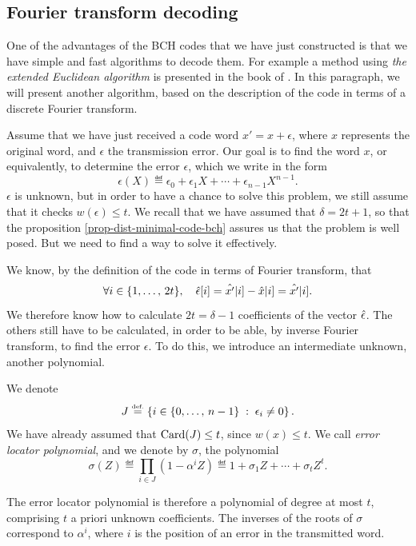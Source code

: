 \subsection{Fourier transform decoding}
\label{sect2-decodage-bch}
 
 
  One of the advantages of the BCH codes that we have just constructed is that we have simple and fast algorithms to decode them. For example a method using \textit{the extended Euclidean algorithm} is presented in the book of  \cite{demazure}. In this paragraph, we will present another algorithm, based on the description of the code in terms of a discrete Fourier transform.
 
 
Assume that we have just received a code word $ x'= x + \epsilon $, where $ x $ represents the original word, and $ \epsilon $ the transmission error. Our goal is to find the word $ x $, or equivalently, to determine the error $ \epsilon $, which we write in the form
\begin{equation*}
\epsilon (X) \eqdef \epsilon_0 + \epsilon_1 X + \cdots + \epsilon_{n-1} X^{n-1}.
\end{equation*}
$ \epsilon $ is unknown, but in order to have a chance to solve this problem, we still assume that it checks $ w (\epsilon) \leq t $. We recall that we have assumed that $ \delta = 2t + 1 $, so that the proposition \ref{prop-dist-minimal-code-bch} assures us that the problem is well posed. But we need to find a way to solve it effectively.
 
 
We know, by the definition of the code in terms of Fourier transform, that
\begin{equation*}
\forall i \in \{1, \ldots, \, 2 t\}, \quad \hat{\epsilon}[i] = \hat{x'} | i] - \hat{x} | i] = \hat{x'} | i].
\end{equation*}
We therefore know how to calculate $ 2t = \delta - 1 $ coefficients of the vector $ \hat{\epsilon} $. The others still have to be calculated, in order to be able, by inverse Fourier transform, to find the error $ \epsilon $. To do this, we introduce an intermediate unknown, another polynomial.
 
\begin{defn}
 We denote
\begin{equation*}
J \stackrel{\mbox{\upshape\tiny def.}}{=} \left\{ i \in \{0, \ldots, \, n-1\} \;:\; \epsilon_i \neq 0 \right\}.
\end{equation*}
We have already assumed that $ \operatorname{Card} (J) \leq t $, since $ w (x) \leq t $. We call \textit{error locator polynomial}, and we denote by $ \sigma $, the polynomial
\begin{equation*}
\sigma (Z) \eqdef \prod_{i \in J}{\left(1 - \alpha^i Z \right)} \eqdef 1 + \sigma_1 Z + \cdots + \sigma_{t} Z^t.
\end{equation*}
\end{defn}
The error locator polynomial is therefore a polynomial of degree at most $ t $, comprising $ t $ a priori unknown coefficients. The inverses of the roots of $ \sigma $ correspond to $ \alpha^i $, where $ i $ is the position of an error in the transmitted word.
 
